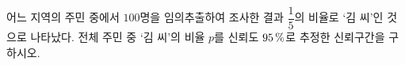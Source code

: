 어느 지역의 주민 중에서 $100$명을 임의추출하여 조사한 결과 $\dfrac{1}{5}$의 비율로 ‘김 씨’인 것으로 나타났다. 전체 주민 중 ‘김 씨’의 비율 $p$를 신뢰도 $95\mkern3mu \%$로 추정한 신뢰구간을 구하시오. 
